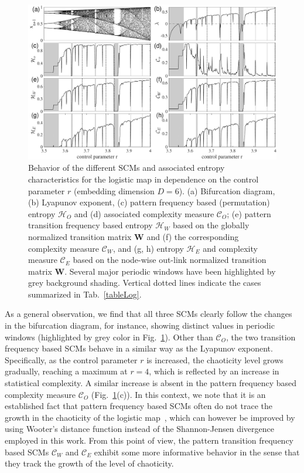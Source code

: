 \documentclass[aip,cha,reprint,nofootinbib]{revtex4-1}
\begin{document}
\begin{figure}
	\centering 
	\includegraphics[width=2\columnwidth]{logisticEntropy.pdf}
\caption{\small{Behavior of the different SCMs and associated entropy characteristics for the logistic map in dependence on the control parameter $r$ {\color{red}(embedding dimension $D = 6$).} (a) Bifurcation diagram, (b) Lyapunov exponent, (c) pattern frequency based (permutation) entropy $\mathcal{H}_O$ and (d) associated complexity measure $\mathcal{C}_O$; (e) pattern transition frequency based entropy $\mathcal{H}_W$ based on the globally normalized transition matrix $\mathbf{W}$ and (f) the corresponding complexity measure $\mathcal{C}_W$, and (g, h) entropy $\mathcal{H}_E$ and complexity measure $\mathcal{C}_E$ based on the node-wise out-link normalized transition matrix $\mathbf{W}$. Several major periodic windows have been highlighted by grey background shading. Vertical dotted lines indicate the cases summarized in Tab.~\ref{tableLog}. } \label{fig:bifurcation}}
\end{figure}

As a general observation, we find that all three SCMs clearly follow the changes in the bifurcation diagram, for instance, showing distinct values in periodic windows (highlighted by grey color in Fig.~\ref{fig:bifurcation}). Other than $\mathcal{C}_O$, the two transition frequency based SCMs behave in a similar way as the Lyapunov exponent. Specifically, as the control parameter $r$ is increased, the chaoticity level grows gradually, reaching a maximum at $r = 4$, which is reflected by an increase in statistical complexity. A similar increase is absent in the pattern frequency based complexity measure $\mathcal{C}_O$ (Fig.~\ref{fig:bifurcation}(c)). In this context, we note that it is an established fact that pattern frequency based SCMs often do not trace the growth in the chaoticity of the logistic map~\cite{MartinPLA2003}, which can however be improved by using Wooter's distance function instead of the Shannon-Jensen divergence employed in this work. From this point of view, the pattern transition frequency based SCMs $\mathcal{C}_W$ and $\mathcal{C}_E$ exhibit some more informative behavior in the sense that they track the growth of the level of chaoticity. 
\end{document}
